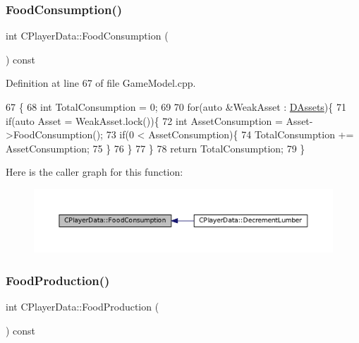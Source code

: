 \subsubsection{\texorpdfstring{Food\+Consumption()}{FoodConsumption()}}
{\footnotesize\ttfamily int C\+Player\+Data\+::\+Food\+Consumption (\begin{DoxyParamCaption}{ }\end{DoxyParamCaption}) const}



Definition at line 67 of file Game\+Model.\+cpp.


\begin{DoxyCode}
67                                       \{
68     \textcolor{keywordtype}{int} TotalConsumption = 0;
69     
70     \textcolor{keywordflow}{for}(\textcolor{keyword}{auto} &WeakAsset : \hyperlink{classCPlayerData_a1d7dd355facf52db6242e3554373906c}{DAssets})\{
71         \textcolor{keywordflow}{if}(\textcolor{keyword}{auto} Asset = WeakAsset.lock())\{
72             \textcolor{keywordtype}{int} AssetConsumption = Asset->FoodConsumption();
73             \textcolor{keywordflow}{if}(0 < AssetConsumption)\{
74                 TotalConsumption += AssetConsumption;    
75             \}
76         \}
77     \}
78     \textcolor{keywordflow}{return} TotalConsumption;
79 \}
\end{DoxyCode}
Here is the caller graph for this function\+:
\nopagebreak
\begin{figure}[H]
\begin{center}
\leavevmode
\includegraphics[width=350pt]{classCPlayerData_a45b5ba15a17796acdbaca7eacc7532d0_icgraph}
\end{center}
\end{figure}
\hypertarget{classCPlayerData_ae71ad19439d31ba0eb7f59809885ed6d}{}\label{classCPlayerData_ae71ad19439d31ba0eb7f59809885ed6d} 
\subsubsection{\texorpdfstring{Food\+Production()}{FoodProduction()}}
{\footnotesize\ttfamily int C\+Player\+Data\+::\+Food\+Production (\begin{DoxyParamCaption}{ }\end{DoxyParamCaption}) const}



